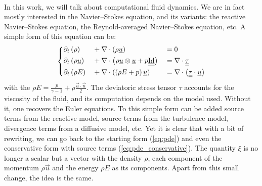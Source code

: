     \paragraph{}
    In this work, we will talk about computational fluid dynamics.
    We are in fact mostly interested in the Navier--Stokes equation, and its variants: the reactive Navier--Stokes equation, the Reynold-averaged Navier--Stokes equation, etc.
    A simple form of this equation can be:
    \begin{equation}\label{eq:ns}
      \left\{\begin{aligned}
        &\partial_t\left(\rho         \right) &&+ \nabla\cdot\left( \rho \underline{u} \right) &&= 0 \\
        &\partial_t\left(\rho \underline{u} \right) &&+ \nabla\cdot\left( \rho \underline{u} \otimes \underline{u} + p \underline{\underline{\operatorname{Id}}} \right) &&= \nabla\cdot \underline{\underline{\tau}}\\
        &\partial_t\left( \rho E      \right) &&+ \nabla\cdot\left( \left(\rho E + p\right) \underline{u} \right) &&=
          \nabla\cdot\left( \underline{\underline{\tau}} \cdot \underline{u} \right)
      \end{aligned}\right.
    \end{equation}
    with the  $\rho E = \frac{p}{\gamma - 1} + \rho\frac{\vec{u} \cdot \vec{u}}{2}$.
    The deviatoric stress tensor $\tau$ accounts for the viscosity of the fluid, and its computation depends on the model used.
    Without it, one recovers the Euler equations.
    To this simple form can be added source terms from the reactive model, source terms from the turbulence model, divergence terms from a diffusive model, etc.
    Yet it is clear that with a bit of rewriting, we can go back to the starting form (\ref{eq:pde}) and even the conservative form with source terms (\ref{eq:pde_conservative}).
    The quantity $\xi$ is no longer a scalar but a vector with the density $\rho$, each component of the momentum $\rho\vec{u}$ and the energy $\rho E$ as its components.
    Apart from this small change, the idea is the same.

